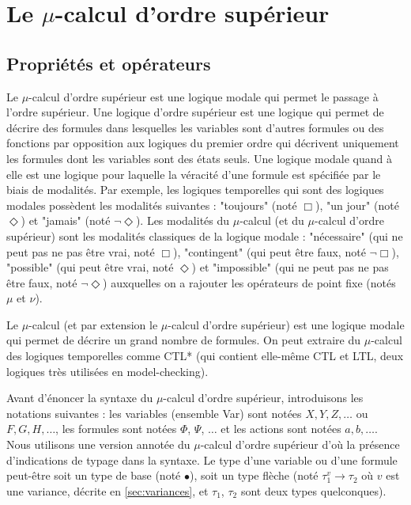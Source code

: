 \documentclass{rapport}
\theoremstyle{plain}
\theoremstyle{remark}
\theoremstyle{definition}
\begin{document}
\section{Le $\mu$-calcul d'ordre supérieur\label{sec:muCalcul}}

\subsection{Propriétés et opérateurs\label{sec:prop&op}}

Le $\mu$-calcul d'ordre supérieur est une logique modale qui permet le passage à l'ordre supérieur. Une logique d'ordre supérieur est une logique qui permet de décrire des formules dans lesquelles les variables sont d'autres formules ou des fonctions par opposition aux logiques du premier ordre qui décrivent uniquement les formules dont les variables sont des états seuls. Une logique modale quand à elle est une logique pour laquelle la véracité d'une formule est spécifiée par le biais de modalités. Par exemple, les logiques temporelles qui sont des logiques modales possèdent les modalités suivantes : "toujours" (noté $\Box$), "un jour" (noté $\Diamond$) et "jamais" (noté $\neg \Diamond$). Les modalités du $\mu$-calcul (et du $\mu$-calcul d'ordre supérieur) sont les modalités classiques de la logique modale : "nécessaire" (qui ne peut pas ne pas être vrai, noté $\Box$), "contingent" (qui peut être faux, noté $\neg \Box$), "possible" (qui peut être vrai, noté $\Diamond$) et "impossible" (qui ne peut pas ne pas être faux, noté $\neg \Diamond$) auxquelles on a rajouter les opérateurs de point fixe (notés $\mu$ et $\nu$).

Le $\mu$-calcul (et par extension le $\mu$-calcul d'ordre supérieur) est une logique modale qui permet de décrire un grand nombre de formules. On peut extraire du $\mu$-calcul des logiques temporelles comme CTL* (qui contient elle-même CTL et LTL, deux logiques très utilisées en model-checking). 

Avant d'énoncer la syntaxe du $\mu$-calcul d'ordre supérieur, introduisons les notations suivantes : les variables (ensemble Var) sont notées $X, Y, Z, \ldots$ ou $F, G, H, \ldots$, les formules sont notées $\Phi$, $\Psi$, $\ldots$ et les actions sont notées $a, b, \ldots$. Nous utilisons une version annotée du $\mu$-calcul d'ordre supérieur d'où la présence d'indications de typage dans la syntaxe. Le type d'une variable ou d'une formule peut-être soit un type de base (noté $\bullet$), soit un type flèche (noté $\tau_1^{v} \rightarrow \tau_2$ où $v$ est une variance, décrite en \ref{sec:variances}, et $\tau_1$, $\tau_2$ sont deux types quelconques).
\end{document}
